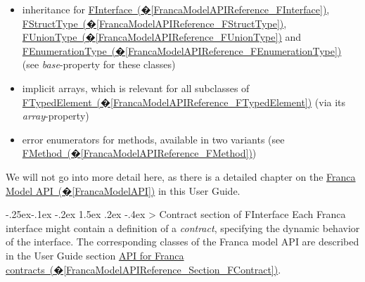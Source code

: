 \documentclass[a4paper,10pt]{scrreprt}
\makeatletter
\renewcommand\subsection{\medskip\@startsection{subsection}{2}{\z@}%
  {-.25ex\@plus -.1ex \@minus -.2ex}%
  {1.5ex \@plus .2ex \@minus -.4ex}%
  {\ifnum \scr@compatibility>\@nameuse{scr@v@2.96}\relax
    \setlength{\parfillskip}{\z@ plus 1fil}\fi
    \raggedsection\normalfont\sectfont\nobreak\size@subsection
  }%
}
\newlength{\XdocItemIndent}
\makeatother
\begin{document}
\setlength{\XdocItemIndent}{\textwidth}
\begin{itemize}
\addtolength{\XdocItemIndent}{-2.5em}
\item \begin{minipage}[t]{\XdocItemIndent}
inheritance for \hyperref[FrancaModelAPIReference_FInterface]{FInterface~(�\ref*{FrancaModelAPIReference_FInterface})},
	     \hyperref[FrancaModelAPIReference_FStructType]{FStructType~(�\ref*{FrancaModelAPIReference_FStructType})},
	     \hyperref[FrancaModelAPIReference_FUnionType]{FUnionType~(�\ref*{FrancaModelAPIReference_FUnionType})} and
	     \hyperref[FrancaModelAPIReference_FEnumerationType]{FEnumerationType~(�\ref*{FrancaModelAPIReference_FEnumerationType})}
	     (see \textit{base}-property for these classes)

\end{minipage}
\item \begin{minipage}[t]{\XdocItemIndent}
implicit arrays, which is relevant for all subclasses of
	     \hyperref[FrancaModelAPIReference_FTypedElement]{FTypedElement~(�\ref*{FrancaModelAPIReference_FTypedElement})}
	     (via its \textit{array}-property)

\end{minipage}
\item \begin{minipage}[t]{\XdocItemIndent}
error enumerators for methods, available in two variants
	     (see \hyperref[FrancaModelAPIReference_FMethod]{FMethod~(�\ref*{FrancaModelAPIReference_FMethod})})

\end{minipage}
\end{itemize}
\addtolength{\XdocItemIndent}{2.5em}

We will not go into more detail here, as there is a detailed chapter on the
\hyperref[FrancaModelAPI]{Franca Model API~(�\ref*{FrancaModelAPI})} in this User Guide.

\subsection{Contract section of FInterface}
\label{BuildingGenerators_TraversingFrancaModels_Contracts}
Each Franca interface might contain a definition of a \textit{contract}, specifying the
dynamic behavior of the interface. The corresponding classes of the Franca model API
are described in the User Guide section 
\hyperref[FrancaModelAPIReference_Section_FContract]{API for Franca contracts~(�\ref*{FrancaModelAPIReference_Section_FContract})}.
\end{document}
